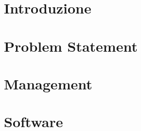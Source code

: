 \documentclass[conference]{IEEEtran}
\begin{document}
\IEEEpeerreviewmaketitle



\section{Introduzione}
\label{intro}


\section{Problem Statement}
\label{PS}

\section{Management}
\label{management}



\section{Software}
\label{software}

\end{document}
